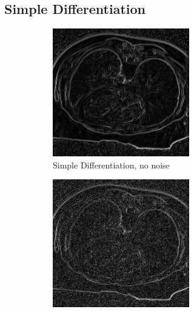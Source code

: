 \documentclass[10pt,a4paper]{article}
\begin{document}
\subsection{Simple Differentiation}
\begin{figure}[H]
  \centering
  
  \begin{subfigure}{.5\textwidth}
    \centering
    \includegraphics[width=.9\textwidth]{./edgedetection/images/sd_no_noise}
    \caption{Simple Differentiation, no noise}
    \label{fig:sd_no_noise}
  \end{subfigure}%
  \begin{subfigure}{.5\textwidth}
    \centering
    \includegraphics[width=.9\textwidth]{./edgedetection/images/sd_001_noise}

\end{subfigure}
\end{figure}
\end{document}
